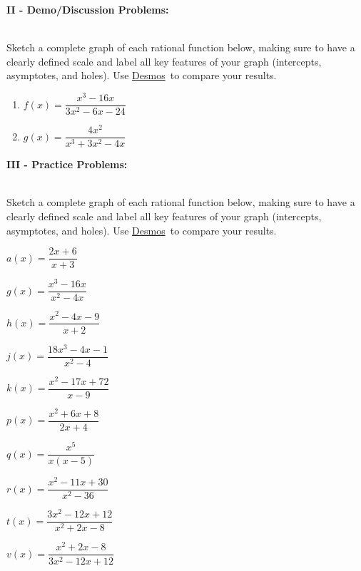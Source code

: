 \documentclass[12pt]{article}
\theoremstyle{definition}
\newcommand{\Desmos}{\href{https://www.desmos.com/}{Desmos}}
\begin{document}
{\bf II - Demo/Discussion Problems:}\\
\ \par
Sketch a complete graph of each rational function below, making sure to have a clearly defined scale and label all key features of your graph (intercepts, asymptotes, and holes).  Use \Desmos \ to compare your results.
\begin{enumerate}
\item $f(x)=\dfrac{x^3-16x}{3x^2-6x-24}$
\item $g(x)=\dfrac{4x^2}{x^3+3x^2-4x}$
\end{enumerate}
{\bf III - Practice Problems:}\\
\ \par
Sketch a complete graph of each rational function below, making sure to have a clearly defined scale and label all key features of your graph (intercepts, asymptotes, and holes).  Use \Desmos \ to compare your results.
\begin{enumerate}
\begin{multicols}{2}
\item $a(x)=\dfrac{2x+6}{x+3}$
\item $g(x)=\dfrac{x^3-16x}{x^2-4x}$
\item $h(x)=\dfrac{x^2-4x-9}{x+2}$
\item $j(x)=\dfrac{18x^3-4x-1}{x^2-4}$
\item $k(x) =\dfrac{x^2-17x+72}{x-9}$
\item $p(x)=\dfrac{x^2+6x+8}{2x+4}$
\item $q(x)=\dfrac{x^5}{x(x-5)}$
\item $r(x)=\dfrac{x^2-11x+30}{x^2-36}$
\item $t(x)=\dfrac{3x^2-12x+12}{x^2+2x-8}$
\item $v(x)=\dfrac{x^2+2x-8} {3x^2-12x+12}$
\end{multicols}
\end{enumerate}
\end{document}
